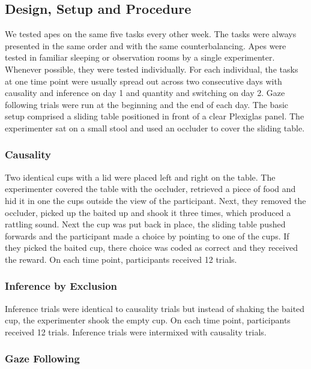 \documentclass[10pt, letterpaper]{article}
\begin{document}
\hypertarget{design-setup-and-procedure}{%
\subsection{Design, Setup and
Procedure}\label{design-setup-and-procedure}}

We tested apes on the same five tasks every other week. The tasks were
always presented in the same order and with the same counterbalancing.
Apes were tested in familiar sleeping or observation rooms by a single
experimenter. Whenever possible, they were tested individually. For each
individual, the tasks at one time point were usually spread out across
two consecutive days with causality and inference on day 1 and quantity
and switching on day 2. Gaze following trials were run at the beginning
and the end of each day. The basic setup comprised a sliding table
positioned in front of a clear Plexiglas panel. The experimenter sat on
a small stool and used an occluder to cover the sliding table.

\hypertarget{causality}{%
\subsubsection{Causality}\label{causality}}

Two identical cups with a lid were placed left and right on the table.
The experimenter covered the table with the occluder, retrieved a piece
of food and hid it in one the cups outside the view of the participant.
Next, they removed the occluder, picked up the baited up and shook it
three times, which produced a rattling sound. Next the cup was put back
in place, the sliding table pushed forwards and the participant made a
choice by pointing to one of the cups. If they picked the baited cup,
there choice was coded as correct and they received the reward. On each
time point, participants received 12 trials.

\hypertarget{inference-by-exclusion}{%
\subsubsection{Inference by Exclusion}\label{inference-by-exclusion}}

Inference trials were identical to causality trials but instead of
shaking the baited cup, the experimenter shook the empty cup. On each
time point, participants received 12 trials. Inference trials were
intermixed with causality trials.

\hypertarget{gaze-following}{%
\subsubsection{Gaze Following}\label{gaze-following}}
\end{document}
